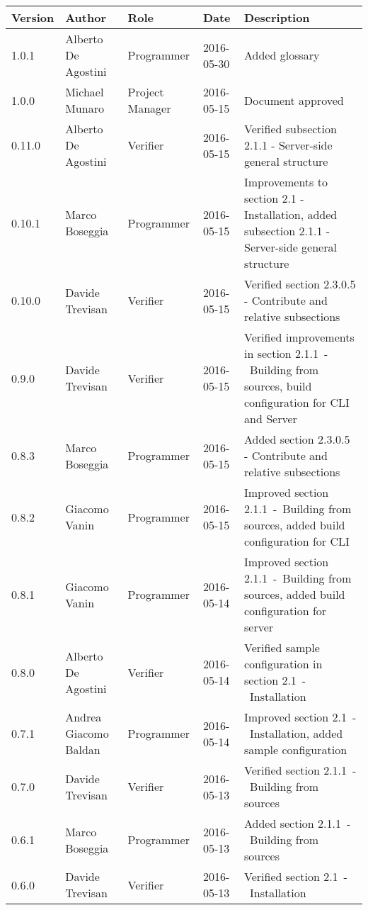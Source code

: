 \documentclass{scalatekids-article}
\begin{document}
\vspace{0cm}
\begin{center}
  \begin{longtable}{| l | l | l | l | p{5cm} |}
    \hline
    Version & Author & Role & Date & Description \\
    \hline
    1.0.1 & Alberto De Agostini & Programmer & 2016-05-30 & Added glossary\\
    \hline
    1.0.0 & Michael Munaro & Project Manager & 2016-05-15 & Document approved\\
    \hline
    0.11.0 & Alberto De Agostini & Verifier & 2016-05-15 & Verified subsection 2.1.1 - Server-side general structure\\
    \hline
    0.10.1 & Marco Boseggia & Programmer & 2016-05-15 & Improvements to section 2.1 - Installation, added subsection 2.1.1 - Server-side general structure\\
    \hline
    0.10.0 & Davide Trevisan & Verifier & 2016-05-15 & Verified section 2.3.0.5 - Contribute and relative subsections\\
    \hline
    0.9.0 & Davide Trevisan & Verifier & 2016-05-15 & Verified improvements in section 2.1.1\ -\ Building from sources, build configuration for CLI and Server\\
    \hline
    0.8.3 & Marco Boseggia & Programmer & 2016-05-15 & Added section 2.3.0.5 - Contribute and relative subsections \\
    \hline
    0.8.2 & Giacomo Vanin & Programmer & 2016-05-15 & Improved section 2.1.1\ -\ Building from sources, added build configuration for CLI\\
    \hline
    0.8.1 & Giacomo Vanin & Programmer & 2016-05-14 & Improved section 2.1.1\ -\ Building from sources, added build configuration for server\\
    \hline
    0.8.0 & Alberto De Agostini & Verifier & 2016-05-14 & Verified sample configuration in section 2.1\ -\ Installation\\
    \hline
    0.7.1 & Andrea Giacomo Baldan & Programmer & 2016-05-14 & Improved section 2.1\ -\ Installation, added sample configuration\\
    \hline
    0.7.0 & Davide Trevisan & Verifier & 2016-05-13 & Verified section 2.1.1\ -\ Building from sources\\
    \hline
    0.6.1 & Marco Boseggia & Programmer & 2016-05-13 & Added section 2.1.1\ -\ Building from sources\\
    \hline
    0.6.0 & Davide Trevisan & Verifier & 2016-05-13 & Verified section 2.1\ -\ Installation\\

\end{longtable}
\end{center}
\end{document}
